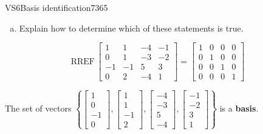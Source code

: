 \begin{exercise}{VS6}{Basis identification}{7365}
\begin{exerciseStatement}
\begin{enumerate}[(a)]
\begin{itemize}
 
\end{itemize}

     
\item  

 Explain how to determine which of these statements is true. 

 
\end{enumerate}

     \end{exerciseStatement}
 \begin{exerciseAnswer} 

 \[
\mathrm{RREF}\, \left[\begin{array}{cccc}
1 & 1 & -4 & -1 \\
0 & 1 & -3 & -2 \\
-1 & -1 & 5 & 3 \\
0 & 2 & -4 & 1
\end{array}\right] = \left[\begin{array}{cccc}
1 & 0 & 0 & 0 \\
0 & 1 & 0 & 0 \\
0 & 0 & 1 & 0 \\
0 & 0 & 0 & 1
\end{array}\right]
            \] 

 

 The set of vectors \(\left\{ \left[\begin{array}{c}
1 \\
0 \\
-1 \\
0
\end{array}\right] , \left[\begin{array}{c}
1 \\
1 \\
-1 \\
2
\end{array}\right] , \left[\begin{array}{c}
-4 \\
-3 \\
5 \\
-4
\end{array}\right] , \left[\begin{array}{c}
-1 \\
-2 \\
3 \\
1
\end{array}\right] \right\}\) is a \textbf{basis}. 

 \end{exerciseAnswer}
 \end{exercise}


